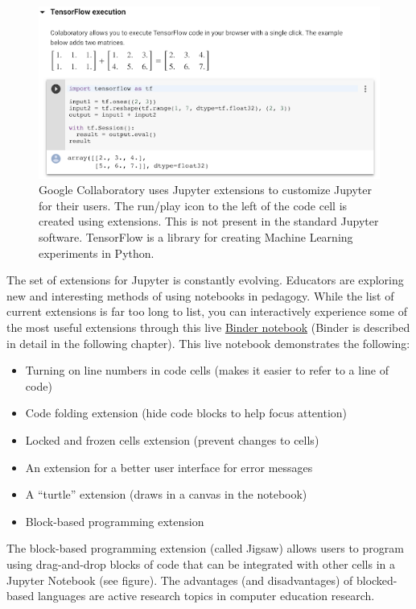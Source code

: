 \documentclass[]{book}
\providecommand{\tightlist}{%
  \setlength{\itemsep}{0pt}\setlength{\parskip}{0pt}}
\begin{document}
\begin{figure}
\centering
\includegraphics{images/chapter53.png}
\caption{Google Collaboratory uses Jupyter extensions to customize
Jupyter for their users. The run/play icon to the left of the code cell
is created using extensions. This is not present in the standard Jupyter
software. TensorFlow is a library for creating Machine Learning
experiments in Python.}
\end{figure}

The set of extensions for Jupyter is constantly evolving. Educators are
exploring new and interesting methods of using notebooks in pedagogy.
While the list of current extensions is far too long to list, you can
interactively experience some of the most useful extensions through this
live
\href{https://hub.mybinder.org/user/psychemedia-showntell-eii7j2nh/notebooks/index_computing.ipynb}{Binder
notebook} (Binder is described in detail in the following chapter). This
live notebook demonstrates the following:

\begin{itemize}
\tightlist
\item
  Turning on line numbers in code cells (makes it easier to refer to a
  line of code)
\item
  Code folding extension (hide code blocks to help focus attention)
\item
  Locked and frozen cells extension (prevent changes to cells)
\item
  An extension for a better user interface for error messages
\item
  A ``turtle'' extension (draws in a canvas in the notebook)
\item
  Block-based programming extension
\end{itemize}

The block-based programming extension (called Jigsaw) allows users to
program using drag-and-drop blocks of code that can be integrated with
other cells in a Jupyter Notebook (see figure). The advantages (and
disadvantages) of blocked-based languages are active research topics in
computer education research.
\end{document}
